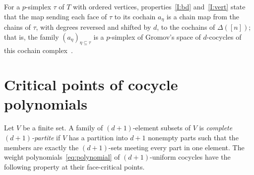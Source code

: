 \documentclass[11pt]{article}
\theoremstyle{definition}
\numberwithin{equation}{section}
\begin{document}
For a $p$-simplex $\tau$ of $T$ with ordered vertices, properties~\ref{I:bd} and~\ref{I:vert} state that the map sending each face of $\tau$ to its cochain $a_\eta$ is a chain map from the chains of $\tau$, with degrees reversed and shifted by $d$, to the cochains of $\Delta([n])$; that is, the family $(a_\eta)_{\eta\subseteq\tau}$ is a $p$-simplex of Gromov's space of $d$-cocycles of this cochain complex~\cite[\S2.2, pp.~429--430]{Gromov}.
\section{Critical points of cocycle polynomials}\label{sec:spectral}

Let $V$ be a finite set. A family of $(d+1)$-element subsets of $V$ is \emph{complete $(d+1)$-partite} if $V$ has a partition into $d+1$ nonempty parts such that the members are exactly the $(d+1)$-sets meeting every part in one element. The weight polynomials~\eqref{eq:polynomial} of $(d+1)$-uniform cocycles have the following property at their face-critical points.
\end{document}
